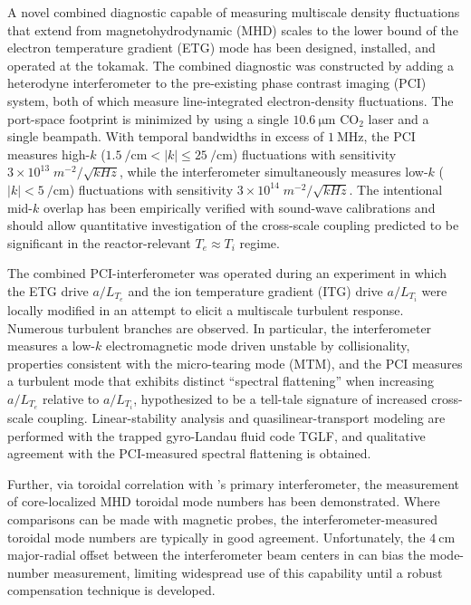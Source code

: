 %
%
%

A novel combined diagnostic capable of measuring multiscale
density fluctuations that extend from
magnetohydrodynamic (MHD) scales to
the lower bound of the electron temperature gradient (ETG) mode
has been designed, installed, and operated at the \diiid\space tokamak.
The combined diagnostic was constructed by adding a heterodyne interferometer
to the pre-existing phase contrast imaging (PCI) system,
both of which measure line-integrated electron-density fluctuations.
The port-space footprint is minimized by using
a single $\SI{10.6}{\micro\meter}$ CO$_2$ laser and
a single beampath.
With temporal bandwidths in excess of $\SI{1}{\mega\hertz}$,
the PCI measures high-$k$
($\SI{1.5}{\per\centi\meter} < |k| \leq \SI{25}{\per\centi\meter}$)
fluctuations with
sensitivity $3 \times 10^{13} \; m^{-2} / \sqrt{kHz}$, while
the interferometer simultaneously measures low-$k$
($|k| < \SI{5}{\per\centi\meter}$) fluctuations with
sensitivity $3 \times 10^{14} \; m^{-2} / \sqrt{kHz}$.
The intentional mid-$k$ overlap
has been empirically verified with sound-wave calibrations and
should allow quantitative investigation of the cross-scale coupling
predicted to be significant in the reactor-relevant $T_e \approx T_i$ regime.

The combined PCI-interferometer was operated during an experiment
in which the ETG drive $a / L_{T_e}$ and
the ion temperature gradient (ITG) drive $a / L_{T_i}$
were locally modified in an attempt to elicit
a multiscale turbulent response.
Numerous turbulent branches are observed.
In particular, the interferometer measures
a low-$k$ electromagnetic mode driven unstable by collisionality,
properties consistent with the micro-tearing mode (MTM), and
the PCI measures a turbulent mode
that exhibits distinct ``spectral flattening''
when increasing $a / L_{T_e}$ relative to $a / L_{T_i}$,
hypothesized to be a tell-tale signature
of increased cross-scale coupling.
Linear-stability analysis and quasilinear-transport modeling
are performed with the trapped gyro-Landau fluid code TGLF, and
qualitative agreement with the PCI-measured spectral flattening
is obtained.

Further, via toroidal correlation with \diiid's primary interferometer,
the measurement of core-localized MHD toroidal mode numbers
has been demonstrated.
Where comparisons can be made with magnetic probes,
the interferometer-measured toroidal mode numbers
are typically in good agreement.
Unfortunately, the $\SI{4}{\centi\meter}$ major-radial offset
between the interferometer beam centers in \diiid\space
can bias the mode-number measurement,
limiting widespread use of this capability
until a robust compensation technique is developed.
